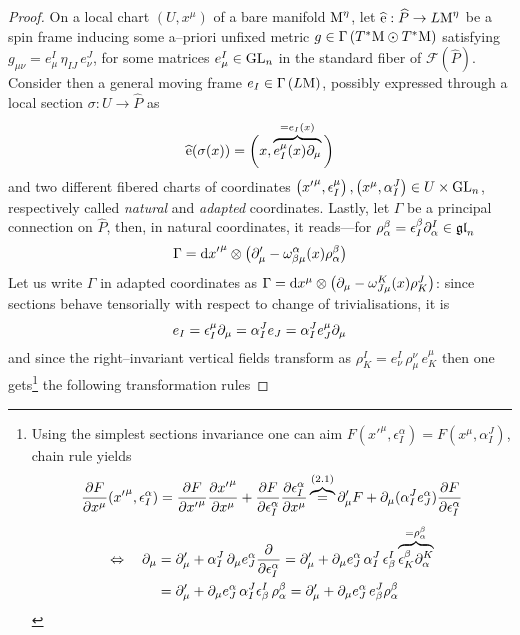 \begin{proof}
    On a local chart $(U,x^\mu)$ of a bare manifold $\text{\normalfont M}^\eta$, let $\widehat{\text{\normalfont e}}:\widehat{P}\to L\text{\normalfont M}^\eta$ be a spin frame inducing some a--priori unfixed metric $g\in\Gamma\left(T^*\text{\normalfont M}\odot T^*\text{\normalfont M}\right)$ satisfying $g_{\mu\nu}=e^I_\mu\,\eta_{IJ}\,e^J_\nu$, for some matrices $e^I_\mu\in\text{\normalfont GL}_n$ in the standard fiber of $\mathcal{F}(\widehat{P})$.\, Consider then a general moving frame $e_I\in\Gamma\left(L\text{\normalfont M}\right)$, possibly expressed through a local section $\sigma:U\to\widehat{P}$ as 
    $$
    \widehat{\text{\normalfont e}}(\sigma(x))=\bigg(x,\overbrace{e^\mu_I(x)\partial_\mu}^{=e_I(x)}\bigg)
    $$
    and two different fibered charts of coordinates $\left({x'}^\mu,\epsilon^\mu_I\right), \left(x^\mu,\alpha^J_I\right)\in U\times\text{\normalfont GL}_n$, respectively called \emph{natural} and \emph{adapted} coordinates. Lastly, let $\Gamma$ be a principal connection on $\widehat{P}$, then, in natural coordinates, it reads---for $\rho^\beta_\alpha=\epsilon^\beta_I\partial^I_\alpha\in\mathfrak{gl}_n$
    $$\Gamma=\text{\normalfont d}{x'}^\mu\otimes\left(\partial_\mu'-\omega^\alpha_{\beta\mu}(x)\rho^\beta_\alpha\right)$$
    Let us write $\Gamma$ in adapted coordinates as $\Gamma=\text{\normalfont d} x^\mu\otimes\left(\partial_\mu-\omega^K_{J\mu}(x)\rho^J_K\right)$: since sections behave tensorially with respect to change of trivialisations, it is
    \begin{equation}
        e_I=\epsilon^\mu_I\partial_\mu=\alpha^J_I e_J=\alpha^J_Ie_J^\mu\partial_\mu
    \end{equation}
    and since the right--invariant vertical fields transform as $\rho^I_K=e^I_\nu\,\rho^\nu_\mu\,e^\mu_K$ then one gets\footnote{
    Using the simplest sections invariance one can aim  $F({x'}^\mu,\epsilon^\alpha_I)=F(x^\mu,\alpha^J_I)$, chain rule yields
    $$\frac{\partial F}{\partial x^\mu}({x'}^\mu,\epsilon^\alpha_I)=\frac{\partial F}{\partial{x'}^\mu}\frac{\partial{x'}^\mu}{\partial x^\mu}+\frac{\partial F}{\partial\epsilon^\alpha_I}\frac{\partial\epsilon^\alpha_I}{\partial x^\mu}\overbrace{=}^{(2.1)}\partial_\mu'F+\partial_\mu(\alpha^J_Ie^\alpha_J)\frac{\partial F}{\partial\epsilon^\alpha_I}$$
    \begin{align*}
        \Leftrightarrow\quad\partial_\mu&=\partial_\mu'+\alpha^J_I\,\partial_\mu e^\alpha_J\frac{\partial}{\partial\epsilon^\alpha_I}=\partial_\mu'+\partial_\mu e^\alpha_J\,\alpha^J_I\,\epsilon^I_\beta\overbrace{\epsilon^\beta_K\partial_\alpha^K}^{=\rho^\beta_\alpha}\\
        &=\partial_\mu'+\partial_\mu e^\alpha_J\,\alpha^J_I\epsilon^I_\beta\,\rho^\beta_\alpha=\partial_\mu'+\partial_\mu e_J^\alpha\,e^J_\beta\rho^\beta_\alpha
    \end{align*}
    } the following transformation rules

\end{proof}
